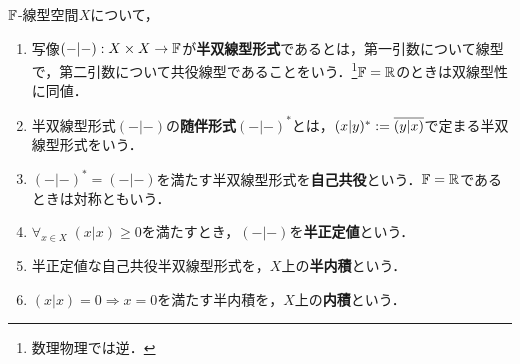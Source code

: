 \documentclass[uplatex,dvipdfmx]{jsreport}
\begin{document}
\begin{definition}
    $\mathbb{F}$-線型空間$X$について，
    \begin{enumerate}
        \item 写像$(-|-):X\times X\to\mathbb{F}$が\textbf{半双線型形式}であるとは，第一引数について線型で，第二引数について共役線型であることをいう．\footnote{数理物理では逆．}$\mathbb{F}=\mathbb{R}$のときは双線型性に同値．
        \item 半双線型形式$(-|-)$の\textbf{随伴形式}$(-|-)^*$とは，$(x|y)^*:=\overline{(y|x)}$で定まる半双線型形式をいう．
        \item $(-|-)^*=(-|-)$を満たす半双線型形式を\textbf{自己共役}という．$\mathbb{F}=\mathbb{R}$であるときは対称ともいう．
        \item $\forall_{x\in X}\;(x|x)\ge 0$を満たすとき，$(-|-)$を\textbf{半正定値}という．
        \item 半正定値な自己共役半双線型形式を，$X$上の\textbf{半内積}という．
        \item $(x|x)=0\Rightarrow x=0$を満たす半内積を，$X$上の\textbf{内積}という．
    \end{enumerate}
\end{definition}
\end{document}
